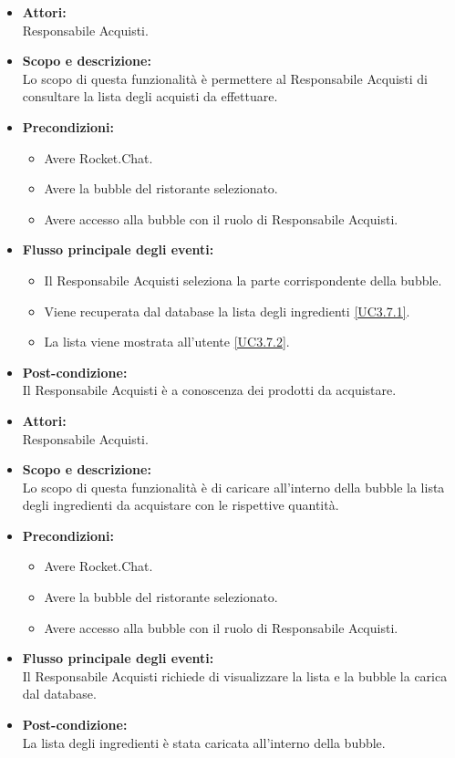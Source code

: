 \begin{itemize}
	\item \textbf{Attori:}
	\\Responsabile Acquisti.
	\item \textbf{Scopo e descrizione:} 
	\\Lo scopo di questa funzionalità è permettere al Responsabile Acquisti di consultare la lista degli acquisti da effettuare.
	\item \textbf{Precondizioni:}
	\begin{itemize}
		\item Avere Rocket.Chat.
		\item Avere la bubble del ristorante selezionato.
		\item Avere accesso alla bubble con il ruolo di Responsabile Acquisti.
	\end{itemize}
	\item \textbf{Flusso principale degli eventi:}
	\begin{itemize}
		\item Il Responsabile Acquisti seleziona la parte corrispondente della bubble.
		\item Viene recuperata dal database la lista degli ingredienti \ref{UC3.7.1}.
		\item La lista viene mostrata all'utente \ref{UC3.7.2}.
	\end{itemize}
	\item \textbf{Post-condizione:}
	\\Il Responsabile Acquisti è a conoscenza dei prodotti da acquistare.
\end{itemize}


\begin{itemize}
	\item \textbf{Attori:}
	\\Responsabile Acquisti.
	\item \textbf{Scopo e descrizione:} 
	\\Lo scopo di questa funzionalità è di caricare all'interno della bubble la lista degli ingredienti da acquistare con le rispettive quantità.
	\item \textbf{Precondizioni:}
	\begin{itemize}
		\item Avere Rocket.Chat.
		\item Avere la bubble del ristorante selezionato.
		\item Avere accesso alla bubble con il ruolo di Responsabile Acquisti.
	\end{itemize}
	\item \textbf{Flusso principale degli eventi:}
	\\Il Responsabile Acquisti richiede di visualizzare la lista e la bubble la carica dal database.
	\item \textbf{Post-condizione:}
	\\La lista degli ingredienti è stata caricata all'interno della bubble.
\end{itemize}

